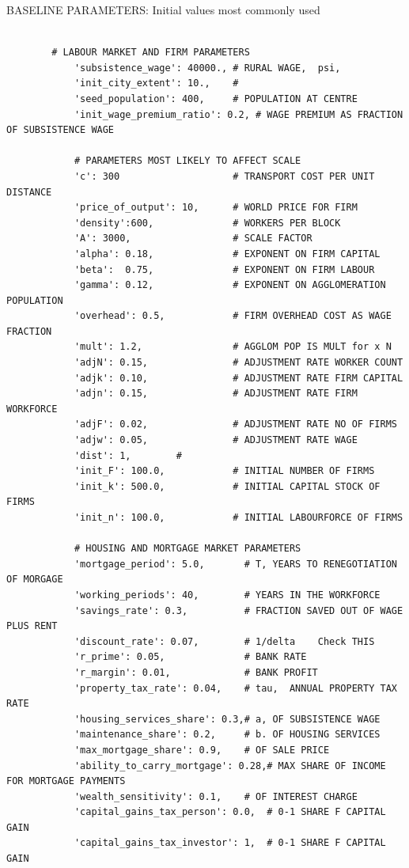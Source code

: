\documentclass{article}
\begin{document}
{\tiny
BASELINE PARAMETERS: Initial values most commonly used 
\begin{verbatim}

        # LABOUR MARKET AND FIRM PARAMETERS
            'subsistence_wage': 40000., # RURAL WAGE,  psi, 
            'init_city_extent': 10.,    # 
            'seed_population': 400,     # POPULATION AT CENTRE
            'init_wage_premium_ratio': 0.2, # WAGE PREMIUM AS FRACTION OF SUBSISTENCE WAGE

            # PARAMETERS MOST LIKELY TO AFFECT SCALE
            'c': 300                    # TRANSPORT COST PER UNIT DISTANCE
            'price_of_output': 10,      # WORLD PRICE FOR FIRM
            'density':600,              # WORKERS PER BLOCK  
            'A': 3000,                  # SCALE FACTOR 
            'alpha': 0.18,              # EXPONENT ON FIRM CAPITAL
            'beta':  0.75,              # EXPONENT ON FIRM LABOUR
            'gamma': 0.12,              # EXPONENT ON AGGLOMERATION POPULATION
            'overhead': 0.5,            # FIRM OVERHEAD COST AS WAGE FRACTION
            'mult': 1.2,                # AGGLOM POP IS MULT for x N
            'adjN': 0.15,               # ADJUSTMENT RATE WORKER COUNT
            'adjk': 0.10,               # ADJUSTMENT RATE FIRM CAPITAL
            'adjn': 0.15,               # ADJUSTMENT RATE FIRM WORKFORCE
            'adjF': 0.02,               # ADJUSTMENT RATE NO OF FIRMS
            'adjw': 0.05,               # ADJUSTMENT RATE WAGE
            'dist': 1,        #
            'init_F': 100.0,            # INITIAL NUMBER OF FIRMS
            'init_k': 500.0,            # INITIAL CAPITAL STOCK OF FIRMS
            'init_n': 100.0,            # INITIAL LABOURFORCE OF FIRMS

            # HOUSING AND MORTGAGE MARKET PARAMETERS
            'mortgage_period': 5.0,       # T, YEARS TO RENEGOTIATION OF MORGAGE
            'working_periods': 40,        # YEARS IN THE WORKFORCE
            'savings_rate': 0.3,          # FRACTION SAVED OUT OF WAGE PLUS RENT
            'discount_rate': 0.07,        # 1/delta    Check THIS
            'r_prime': 0.05,              # BANK RATE          
            'r_margin': 0.01,             # BANK PROFIT          
            'property_tax_rate': 0.04,    # tau,  ANNUAL PROPERTY TAX RATE
            'housing_services_share': 0.3,# a, OF SUBSISTENCE WAGE
            'maintenance_share': 0.2,     # b. OF HOUSING SERVICES
            'max_mortgage_share': 0.9,    # OF SALE PRICE
            'ability_to_carry_mortgage': 0.28,# MAX SHARE OF INCOME  FOR MORTGAGE PAYMENTS
            'wealth_sensitivity': 0.1,    # OF INTEREST CHARGE 
            'capital_gains_tax_person': 0.0,  # 0-1 SHARE F CAPITAL GAIN
            'capital_gains_tax_investor': 1,  # 0-1 SHARE F CAPITAL GAIN
    
\end{verbatim}
}
\newpage
\end{document}
